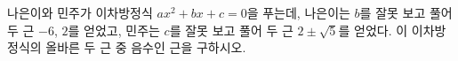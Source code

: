 나은이와 민주가 이차방정식 $ax^2+bx+c=0$을 푸는데, 나은이는 $b$를 잘못 보고 풀어 두 근 $-6$, $2$를 얻었고, 민주는 $c$를 잘못 보고 풀어 두 근 $2\pm\sqrt{5}$를 얻었다. 이 이차방정식의 올바른 두 근 중 음수인 근을 구하시오. 

